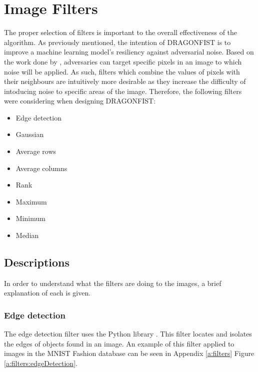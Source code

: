 \section{Image Filters} \label{s:filters}
	The proper selection of filters is important to the overall effectiveness of the algorithm. As previously mentioned, the intention of DRAGONFIST is to improve a machine learning model's resiliency against adversarial noise. Based on the work done by \citeauthor{goodfellow2015} \cite{goodfellow2015}, adversaries can target specific pixels in an image to which noise will be applied. As such, filters which combine the values of pixels with their neighbours are intuitively more desirable as they increase the difficulty of intoducing noise to specific areas of the image. Therefore, the following filters were considering when designing DRAGONFIST:
	\begin{multicols}{2}
		\begin{itemize}
			\item Edge detection
			\item Gaussian
			\item Average rows
			\item Average columns
			\item Rank
			\item Maximum
			\item Minimum
			\item Median
		\end{itemize}
	\end{multicols}

	\subsection{Descriptions} \label{s:filters:descriptions}
		In order to understand what the filters are doing to the images, a brief explanation of each is given.

		\subsubsection{Edge detection} \label{s:filters:descriptions:edgeDetection}
			The edge detection filter uses the Python library  \cite{skikitImage}. This filter locates and isolates the edges of objects found in an image. An example of this filter applied to images in the MNIST Fashion database \cite{zalandoresearchFashionMNIST} can be seen in Appendix \ref{a:filters} Figure \ref{a:filters:edgeDetection}.

